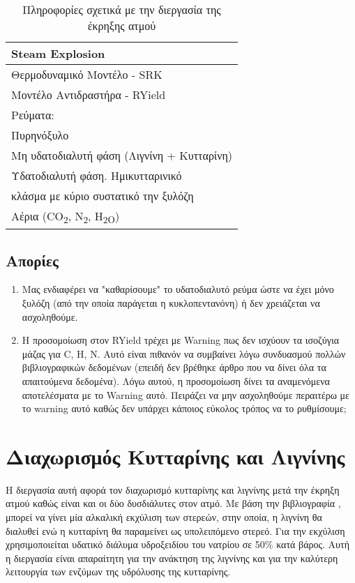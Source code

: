 \documentclass[11pt]{article}
\begin{document}
\begin{table}[htbp]
\caption{Πληροφορίες σχετικά με την διεργασία της έκρηξης ατμού}
\centering
\begin{tabular}{l}
\hline
Steam Explosion\\
\hline
Θερμοδυναμικό Μοντέλο - SRK\\
Μοντέλο Αντιδραστήρα - RYield\\
Ρεύματα:\\
\hline
Πυρηνόξυλο\\
\hline
Μη υδατοδιαλυτή φάση  (Λιγνίνη + Κυτταρίνη)\\
\hline
Υδατοδιαλυτή φάση. Ημικυτταρινικό\\
κλάσμα με κύριο συστατικό την ξυλόζη\\
\hline
Αέρια (CO\textsubscript{2}, N\textsubscript{2}, H\textsubscript{2O})\\
\hline
\end{tabular}
\end{table}

\subsection{Απορίες}
\label{sec:orgaecd35f}
\begin{enumerate}
\item Μας ενδιαφέρει να "καθαρίσουμε" το υδατοδιαλυτό ρεύμα ώστε να έχει μόνο ξυλόζη (από την οποία παράγεται η κυκλοπεντανόνη) ή δεν χρειάζεται να ασχοληθούμε.
\item Η προσομοίωση στον RYield τρέχει με Warning πως δεν ισχύουν τα ισοζύγια μάζας για C, H, N. Αυτό είναι πιθανόν να συμβαίνει λόγω συνδυασμού πολλών βιβλιογραφικών δεδομένων (επειδή δεν βρέθηκε άρθρο που να δίνει όλα τα απαιτούμενα δεδομένα). Λόγω αυτού, η προσομοίωση δίνει τα αναμενόμενα αποτελέσματα με το Warning αυτό. Πειράζει να μην ασχοληθούμε περαιτέρω με το warning αυτό καθώς δεν υπάρχει κάποιος εύκολος τρόπος να το ρυθμίσουμε;
\end{enumerate}

\section{Διαχωρισμός Κυτταρίνης και Λιγνίνης}
\label{sec:org5fe03e1}
Η διεργασία αυτή αφορά τον διαχωρισμό κυτταρίνης και λιγνίνης μετά την έκρηξη ατμού καθώς είναι και οι δύο δυσδιάλυτες στον ατμό. Με βάση την βιβλιογραφία \cite{rodriguezOliveStoneAttractive2008}, μπορεί να γίνει μία αλκαλική εκχύλιση των στερεών, στην οποία, η λιγνίνη θα διαλυθεί ενώ η κυτταρίνη θα παραμείνει ως υπολειπόμενο στερεό. Για την εκχύλιση χρησιμοποιείται υδατικό
διάλυμα υδροξειδίου του νατρίου σε 50\% κατά βάρος. Αυτή η διεργασία είναι απαραίτητη για την ανάκτηση της λιγνίνης και για την καλύτερη λειτουργία των ενζύμων της υδρόλυσης της κυτταρίνης.
\end{document}
